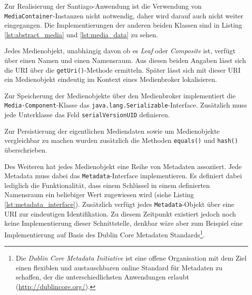   Zur Realisierung der Santiago-Anwendung ist die Verwendung von \verb!MediaContainer!-Instanzen nicht notwendig, daher wird darauf auch nicht weiter eingegangen. Die Implementierungen der anderen beiden Klassen sind in Listing \ref{lst:abstract_media} und \ref{lst:media_data} zu sehen.

  

  
  
  Jedes Medienobjekt, unabhängig davon ob es \emph{Leaf} oder \emph{Composite} ist, verfügt über einen Namen und einen Namensraum. Aus diesen beiden Angaben lässt sich die URI über die \verb!getUri()!-Methode ermitteln. Später lässt sich mit dieser URI ein Medienobjekt eindeutig im Kontext eines Medienbroker lokalisieren.
  
  Zur Speicherung der Medienobjekte über den Medienbroker implementiert die \verb!Media-Component!-Klasse das \verb!java.lang.Serializable!-Interface. Zusätzlich muss jede Unterklasse das Feld \verb!serialVersionUID! definieren.
  
  Zur Persistierung der eigentlichen Mediendaten sowie um Medienobjekte vergleichbar zu machen wurden zusätzlich die Methoden \verb!equals()! und \verb!hash()! überschrieben.
  
  Des Weiteren hat jedes Medienobjekt eine Reihe von Metadaten assoziiert. Jede Metadata muss dabei das \verb!Metadata!-Interface implementieren. Es definiert dabei lediglich die Funktionalität, dass einem Schlüssel in einem definierten Namensraum ein beliebiger Wert zugewiesen wird (siehe Listing \ref{lst:metadata_interface}). Zusätzlich verfügt jedes \verb!Metadata!-Objekt über eine URI zur eindeutigen Identifikation. Zu diesem Zeitpunkt existiert jedoch noch keine Implementierung dieser Schnittstelle, denkbar wäre aber zum Beispiel eine Implementierung auf Basis des Dublin Core Metadaten Standards\footnote{Die \emph{Dublin Core Metadata Initiative} ist eine offene Organisation mit dem Ziel einen flexiblen und austauschbaren online Standard für Metadaten zu schaffen, der die unterschiedlichsten Anwendungen erlaubt (\url{http://dublincore.org/}).}.
  
